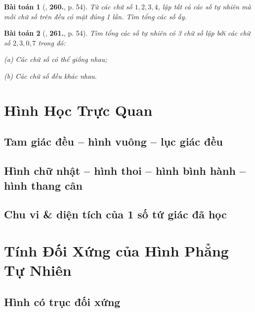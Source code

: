 \documentclass{article}
\numberwithin{equation}{section}
\newtheorem{baitoan}{Bài toán}[section]
\begin{document}
\begin{baitoan}[\cite{Binh_Toan_6_tap_1}, \textbf{260.}, p. 54]
	Từ các chữ số $1,2,3,4$, lập tất cả các số tự nhiên mà mỗi chữ số trên đều có mặt đúng 1 lần. Tìm tổng các số ấy.
\end{baitoan}

\begin{baitoan}[\cite{Binh_Toan_6_tap_1}, \textbf{261.}, p. 54]
	Tìm tổng các số tự nhiên có 3 chữ số lập bởi các chữ số $2,3,0,7$ trong đó:
	\begin{enumerate*}
		\item[(a)] Các chữ số có thể giống nhau;
		\item[(b)] Các chữ số đều khác nhau.
	\end{enumerate*}
\end{baitoan}


\newpage
\section{Hình Học Trực Quan}

\subsection{Tam giác đều -- hình vuông -- lục giác đều}

\subsection{Hình chữ nhật -- hình thoi -- hình bình hành -- hình thang cân}

\subsection{Chu vi \& diện tích của 1 số tứ giác đã học}


\section{Tính Đối Xứng của Hình Phẳng Tự Nhiên}

\subsection{Hình có trục đối xứng}
\end{document}

